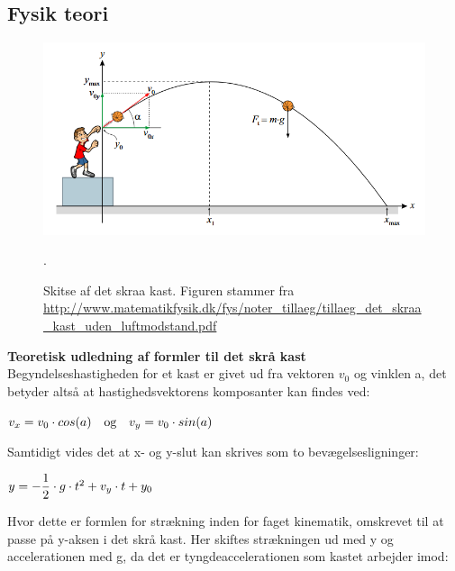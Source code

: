 

\subsection{Fysik teori}

\begin{figure}[H]
\centering
\includegraphics[scale=0.7]{Billeder/skrakast.png}
\caption{Skitse af det skraa kast. Figuren stammer fra \url{http://www.matematikfysik.dk/fys/noter_tillaeg/tillaeg_det_skraa_kast_uden_luftmodstand.pdf}}.
\label{fig:Resultatbehandling3}
\end{figure}

\textbf{Teoretisk udledning af formler til det skrå kast}\\
Begyndelseshastigheden for et kast er givet ud fra vektoren $v_{0}$ og vinklen a, det betyder altså at hastighedsvektorens komposanter kan findes ved:\\

\begin{center}
\begin{math}
\centering
v_{x} = v_{0} \cdot cos(a) \quad \textrm{og} \quad v_{y} = v_{0} \cdot sin(a)
\end{math}
\end{center}

Samtidigt vides det at x- og y-slut kan skrives som to bevægelsesligninger:\\

\begin{center}
\begin{math}
\centering
y = -\dfrac{1}{2} \cdot g \cdot t^{2} + v_{y} \cdot t + y_{0}
\end{math}
\end{center}



Hvor dette er formlen for strækning inden for faget kinematik, omskrevet til at passe på y-aksen i det skrå kast. Her skiftes strækningen ud med y og accelerationen med g, da det er tyngdeaccelerationen som kastet arbejder imod:\\

